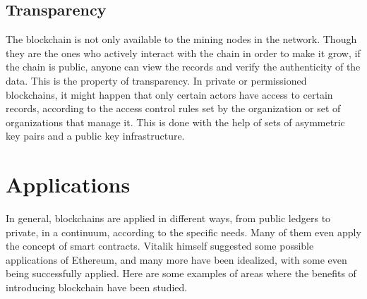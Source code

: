 
\subsection{Transparency}
   The blockchain is not only available to the mining nodes in the network. Though they are the ones who actively interact with the chain in order to make it grow, if the chain is public, anyone can view the records and verify the authenticity of the data. This is the property of transparency. In private or permissioned blockchains, it might happen that only certain actors have access to certain records, according to the access control rules set by the organization or set of organizations that manage it. This is done with the help of sets of asymmetric key pairs and a public key infrastructure.
    



\section{Applications}

    In general, blockchains are applied in different ways, from public ledgers to private, in a continuum, according to the specific needs. Many of them even apply the concept of smart contracts. Vitalik himself suggested some possible applications of Ethereum, and many more have been idealized, with some even being successfully applied. Here are some examples of areas where the benefits of introducing blockchain have been studied.
    


